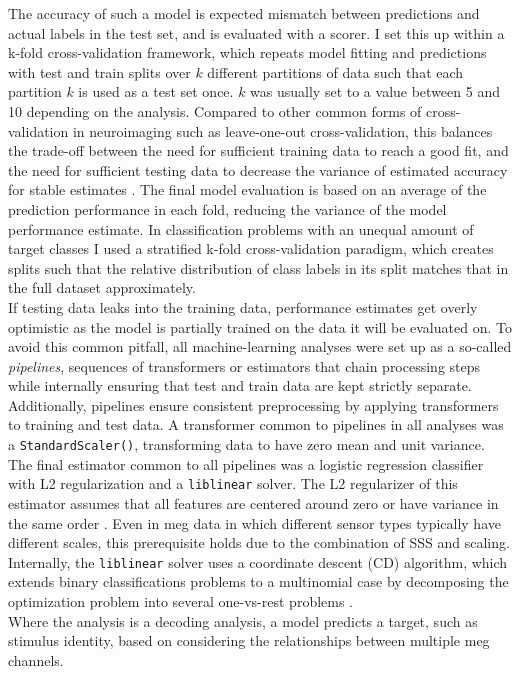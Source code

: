 The accuracy of such a model is expected mismatch between predictions and actual labels in the test set, and is evaluated with a scorer.
I set this up within a k-fold cross-validation framework, which repeats model fitting and predictions with test and train splits over $k$ different partitions of data such that each partition $k$ is used as a test set once.
$k$ was usually set to a value between 5 and 10 depending on the analysis.
Compared to other common forms of cross-validation in neuroimaging such as leave-one-out cross-validation, this balances the trade-off between the need for sufficient training data to reach a good fit, and the need for sufficient testing data to decrease the variance of estimated accuracy for stable estimates \citep{VAROQUAUX2017166}.
The final model evaluation is based on an average of the prediction performance in each fold, reducing the variance of the model performance estimate.
In classification problems with an unequal amount of target classes I used a stratified k-fold cross-validation paradigm, which creates splits such that the relative distribution of class labels in its split matches that in the full dataset approximately.\\
If testing data leaks into the training data, performance estimates get overly optimistic as the model is partially trained on the data it will be evaluated on.
To avoid this common pitfall, all machine-learning analyses were set up as a so-called \textit{pipelines}, sequences of transformers or estimators that chain processing steps while internally ensuring that test and train data are kept strictly separate.
Additionally, pipelines ensure consistent preprocessing by applying transformers to training and test data.
A transformer common to pipelines in all analyses was a \texttt{StandardScaler()}, transforming data to have zero mean and unit variance.
The final estimator common to all pipelines was a logistic regression classifier with L2 regularization and a \texttt{liblinear} solver.
The L2 regularizer of this estimator assumes that all features are centered around zero or have variance in the same order \citep{scikit-learn-scaler}.
Even in \gls{meg} data in which different sensor types typically have different scales, this prerequisite holds due to the combination of \gls{SSS} and scaling.
Internally, the \texttt{liblinear} solver uses a coordinate descent (CD) algorithm, which extends binary classifications problems to a multinomial case by decomposing the optimization problem into several one-vs-rest problems \citep{scikit-learn-liblinear}.\\
Where the analysis is a decoding analysis, a model predicts a target, such as stimulus identity, based on considering the relationships between multiple \gls{meg} channels.



